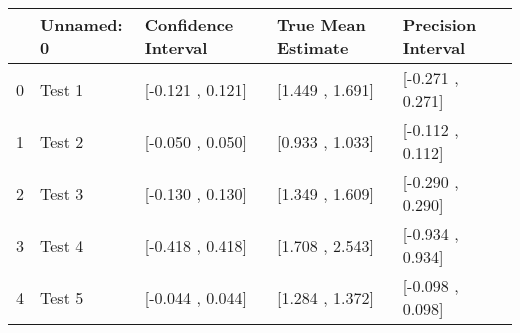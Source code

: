 \begin{tabular}{lllll}
\toprule
{} & Unnamed: 0 & Confidence Interval & True Mean Estimate & Precision Interval \\
\midrule
0 &     Test 1 &    [-0.121 , 0.121] &    [1.449 , 1.691] &   [-0.271 , 0.271] \\
1 &     Test 2 &    [-0.050 , 0.050] &    [0.933 , 1.033] &   [-0.112 , 0.112] \\
2 &     Test 3 &    [-0.130 , 0.130] &    [1.349 , 1.609] &   [-0.290 , 0.290] \\
3 &     Test 4 &    [-0.418 , 0.418] &    [1.708 , 2.543] &   [-0.934 , 0.934] \\
4 &     Test 5 &    [-0.044 , 0.044] &    [1.284 , 1.372] &   [-0.098 , 0.098] \\
\bottomrule
\end{tabular}
